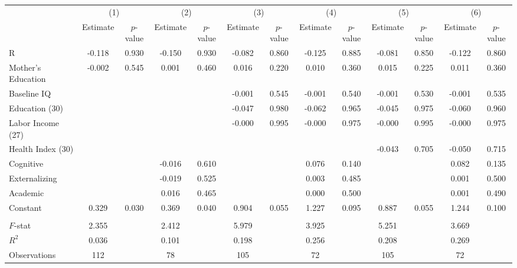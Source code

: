 \begin{tabular}{lcccccccccccc} \toprule
 & \multicolumn{2}{c}{(1)}  &  \multicolumn{2}{c}{(2)}  &  \multicolumn{2}{c}{(3)}  &  \multicolumn{2}{c}{(4)}  & \multicolumn{2}{c}{(5)} & \multicolumn{2}{c}{(6)} \\  
 & Estimate & $p$-value & Estimate & $p$-value & Estimate & $p$-value & Estimate & $p$-value & Estimate & $p$-value & Estimate & $p$-value \\ \midrule
R &    -0.118 &     0.930 &    -0.150 &     0.930 &    -0.082 &     0.860 &    -0.125 &     0.885 &    -0.081 &     0.850 &    -0.122 &     0.860 \\  
Mother's Education &    -0.002 &     0.545 &     0.001 &     0.460 &     0.016 &     0.220 &     0.010 &     0.360 &     0.015 &     0.225 &     0.011 &     0.360 \\  
Baseline IQ &         &        &        &        &   -0.001 &     0.545 &    -0.001 &     0.540 &    -0.001 &     0.530 &    -0.001 &     0.535 \\  
Education (30) &         &        &        &        &   -0.047 &     0.980 &    -0.062 &     0.965 &    -0.045 &     0.975 &    -0.060 &     0.960 \\  
Labor Income (27)  &         &        &        &        &   -0.000 &     0.995 &    -0.000 &     0.975 &    -0.000 &     0.995 &    -0.000 &     0.975 \\  
Health Index (30) &         &        &        &        &        &        &        &        &   -0.043 &     0.705 &    -0.050 &     0.715 \\  
Cognitive &         &        &   -0.016 &     0.610 &         &        &    0.076 &     0.140 &         &        &    0.082 &     0.135 \\  
Externalizing &         &        &   -0.019 &     0.525 &         &        &    0.003 &     0.485 &         &        &    0.001 &     0.500 \\  
Academic &         &        &    0.016 &     0.465 &         &        &    0.000 &     0.500 &         &        &    0.001 &     0.490 \\  
Constant  &     0.329 &     0.030 &     0.369 &     0.040 &     0.904 &     0.055 &     1.227 &     0.095 &     0.887 &     0.055 &     1.244 &     0.100 \\  \\ \midrule
$F$-stat &     2.355 &      &     2.412 &      &     5.979 &     &     3.925 &     &     5.251 &     &     3.669 &   \\  
$R^2$ &     0.036 &   &     0.101 &     &     0.198 &     &     0.256 &   &     0.208 &      &     0.269 &     \\  
Observations &   112 &     &    78 &      &   105 &     &    72 &  &   105 &     &    72 &      \\  
\bottomrule \end{tabular}
